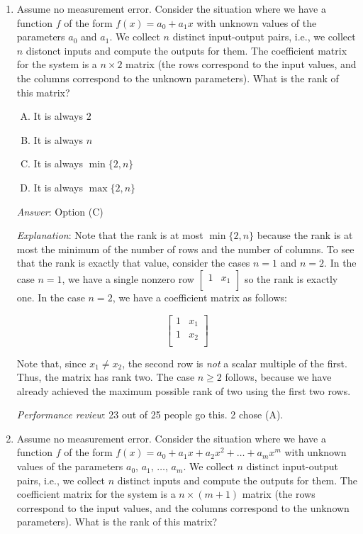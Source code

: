 \documentclass[10pt]{amsart}
\begin{document}
\begin{enumerate}

\item Assume no measurement error. Consider the situation where we
  have a function $f$ of the form $f(x) = a_0 + a_1x$ with unknown
  values of the parameters $a_0$ and $a_1$. We collect $n$ distinct
  input-output pairs, i.e., we collect $n$ distonct inputs and compute
  the outputs for them. The coefficient matrix for the system is a $n
  \times 2$ matrix (the rows correspond to the input values, and the
  columns correspond to the unknown parameters). What is the rank of
  this matrix?

  \begin{enumerate}[(A)]
  \item It is always $2$
  \item It is always $n$
  \item It is always $\min \{ 2, n \}$
  \item It is always $\max \{ 2, n \}$
  \end{enumerate}

  {\em Answer}: Option (C)

  {\em Explanation}: Note that the rank is at most $\min \{ 2,n \}$
  because the rank is at most the minimum of the number of rows and
  the number of columns. To see that the rank is exactly that value,
  consider the cases $n = 1$ and $n = 2$. In the case $n = 1$, we have
  a single nonzero row $\left[\begin{matrix} 1 & x_1 \\\end{matrix}\right]$ so the rank is exactly one. In the
  case $n = 2$, we have a coefficient matrix as follows:

  $$\left[\begin{matrix} 1 & x_1 \\ 1 & x_2 \\\end{matrix}\right]$$

  Note that, since $x_1 \ne x_2$, the second row is {\em not} a scalar
  multiple of the first. Thus, the matrix has rank two. The case $n
  \ge 2$ follows, because we have already achieved the maximum
  possible rank of two using the first two rows.

  {\em Performance review}: 23 out of 25 people go this. 2 chose (A).

\item Assume no measurement error. Consider the situation where we
  have a function $f$ of the form $f(x) =a_0 + a_1x + a_2x^2 + \dots +
  a_mx^m$ with unknown values of the parameters $a_0$, $a_1$, $\dots$,
  $a_m$. We collect $n$ distinct input-output pairs, i.e., we collect
  $n$ distinct inputs and compute the outputs for them. The
  coefficient matrix for the system is a $n \times (m + 1)$ matrix
  (the rows correspond to the input values, and the columns correspond
  to the unknown parameters). What is the rank of this matrix?


\end{enumerate}
\end{document}
